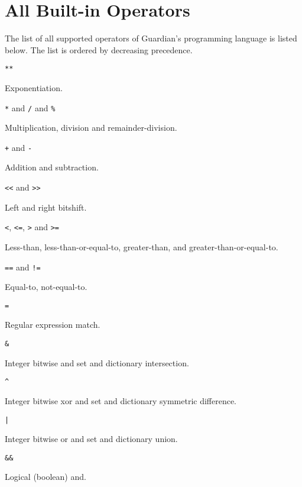 
\section{All Built-in Operators}
{
	The list of all supported operators of Guardian's programming language
	is listed below. The list is ordered by decreasing precedence.
	
	\begin{itemize}
	{
		\item[] \texttt{**}
		
			Exponentiation.
		
		\item[] \texttt{*} and \texttt{/} and \texttt{\%}
		
			Multiplication, division and remainder-division.
		
		\item[] \texttt{+} and \texttt{-}
		
			Addition and subtraction.
		
		\item[] \texttt{<<} and \texttt{>>}
		
			Left and right bitshift.
		
		\item[] \texttt{<}, \texttt{<=}, \texttt{>} and \texttt{>=}
		
			Less-than, less-than-or-equal-to,
			greater-than, and greater-than-or-equal-to.
		
		\item[] \texttt{==} and \texttt{!=}
		
			Equal-to, not-equal-to.
		
		\item[] \texttt{=~}
		
			Regular expression match.
		
		\item[] \texttt{\&}
		
			Integer bitwise and set and dictionary intersection.
		
		\item[] \texttt{\^{}}
		
			Integer bitwise xor and set and dictionary symmetric difference.
		
		\item[] \texttt{|}
		
			Integer bitwise or and set and dictionary union.
		
		\item[] \texttt{\&\&}
		
			Logical (boolean) and.
		
}
\end{itemize}}
